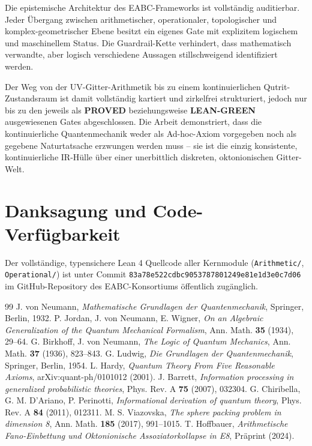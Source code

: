 \documentclass[11pt,a4paper]{article}
\begin{document}
Die epistemische Architektur des EABC-Frameworks ist vollständig auditierbar. Jeder Übergang zwischen arithmetischer, operationaler, topologischer und komplex-geometrischer Ebene besitzt ein eigenes Gate mit explizitem logischem und maschinellem Status. Die Guardrail-Kette verhindert, dass mathematisch verwandte, aber logisch verschiedene Aussagen stillschweigend identifiziert werden. 

Der Weg von der UV-Gitter-Arithmetik bis zu einem kontinuierlichen Qutrit-Zustandsraum ist damit vollständig kartiert und zirkelfrei strukturiert, jedoch nur bis zu den jeweils als \textbf{PROVED} beziehungsweise \textbf{LEAN-GREEN} ausgewiesenen Gates abgeschlossen. Die Arbeit demonstriert, dass die kontinuierliche Quantenmechanik weder als Ad-hoc-Axiom vorgegeben noch als gegebene Naturtatsache erzwungen werden muss -- sie ist die einzig konsistente, kontinuierliche IR-Hülle über einer unerbittlich diskreten, oktonionischen Gitter-Welt.

\section*{Danksagung und Code-Verfügbarkeit}
Der vollständige, typensichere Lean 4 Quellcode aller Kernmodule (\texttt{Arithmetic/}, \texttt{Operational/}) ist unter Commit \texttt{83a78e522cdbc9053787801249e81e1d3e0c7d06} im GitHub-Repository des EABC-Konsortiums öffentlich zugänglich.

\begin{thebibliography}{99}
 J. von Neumann, \emph{Mathematische Grundlagen der Quantenmechanik}, Springer, Berlin, 1932.
 P. Jordan, J. von Neumann, E. Wigner, \emph{On an Algebraic Generalization of the Quantum Mechanical Formalism}, Ann. Math. \textbf{35} (1934), 29--64.
 G. Birkhoff, J. von Neumann, \emph{The Logic of Quantum Mechanics}, Ann. Math. \textbf{37} (1936), 823--843.
 G. Ludwig, \emph{Die Grundlagen der Quantenmechanik}, Springer, Berlin, 1954.
 L. Hardy, \emph{Quantum Theory From Five Reasonable Axioms}, arXiv:quant-ph/0101012 (2001).
 J. Barrett, \emph{Information processing in generalized probabilistic theories}, Phys. Rev. A \textbf{75} (2007), 032304.
 G. Chiribella, G. M. D'Ariano, P. Perinotti, \emph{Informational derivation of quantum theory}, Phys. Rev. A \textbf{84} (2011), 012311.
 M. S. Viazovska, \emph{The sphere packing problem in dimension 8}, Ann. Math. \textbf{185} (2017), 991--1015.
 T. Hoffbauer, \emph{Arithmetische Fano-Einbettung und Oktonionische Assoziatorkollapse in E8}, Präprint (2024).
\end{thebibliography}
\end{document}
